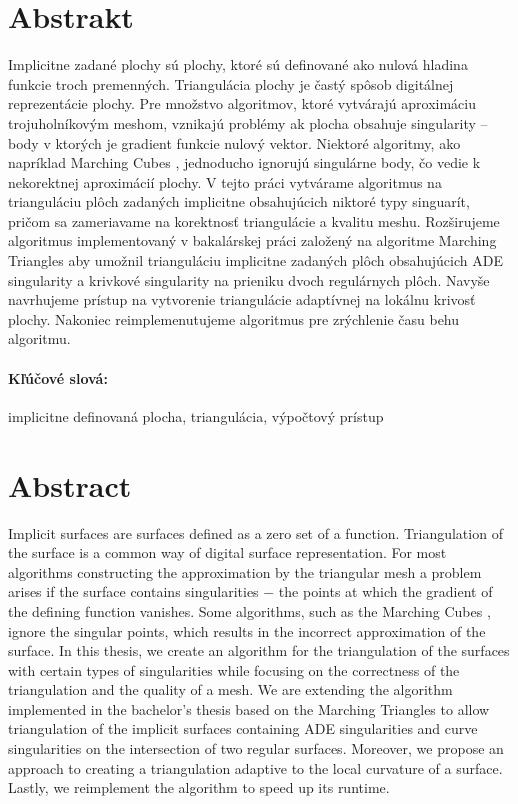 \documentclass[12pt, twoside]{book}
\begin{document}

\newpage 
\section*{Abstrakt}

Implicitne zadané plochy sú plochy, ktoré sú definované ako nulová hladina
funkcie troch premenných. Triangulácia plochy je častý spôsob digitálnej reprezentácie
plochy.
Pre množstvo algoritmov, ktoré vytvárajú aproximáciu trojuholníkovým meshom,
vznikajú problémy ak plocha obsahuje singularity -- body v ktorých je gradient funkcie
nulový vektor.
Niektoré algoritmy, ako napríklad Marching Cubes \cite{lorensen1987marching},
jednoducho ignorujú singulárne body, čo vedie k nekorektnej aproximácií plochy.
V tejto práci vytvárame algoritmus na trianguláciu plôch zadaných implicitne
obsahujúcich niktoré typy singuarít, pričom sa zameriavame na korektnosť
triangulácie a kvalitu meshu.
Rozširujeme algoritmus implementovaný v bakalárskej práci \cite{korecova2021triangulation}
založený na algoritme Marching Triangles \cite{hilton1996marching}
aby umožnil trianguláciu implicitne zadaných plôch obsahujúcich 
ADE singularity a krivkové singularity na prieniku dvoch regulárnych plôch.
Navyše navrhujeme prístup na vytvorenie triangulácie adaptívnej na 
lokálnu krivosť plochy. Nakoniec reimplemenutujeme algoritmus 
\cite{korecova2021triangulation} pre zrýchlenie času behu algoritmu.
\paragraph*{Kľúčové slová:} implicitne definovaná plocha, triangulácia, výpočtový prístup



\newpage 
\section*{Abstract}Implicit surfaces are surfaces defined as a zero set of a function.
Triangulation of the surface is a common way of digital surface
representation.
For most algorithms constructing the approximation by the triangular mesh
a problem arises if the surface contains singularities $-$ the points at which 
the gradient of the defining function vanishes.
Some algorithms, such as the Marching Cubes \cite{lorensen1987marching},
ignore the singular points, which results in the incorrect approximation
of the surface.
In this thesis, we create an algorithm for the triangulation of 
the surfaces with certain types of singularities while focusing on the
correctness of the triangulation and the quality of a mesh.
We are extending the algorithm implemented in the bachelor's thesis 
\cite{korecova2021triangulation}
based on the Marching Triangles \cite{hilton1996marching} to allow 
triangulation of the implicit surfaces containing ADE singularities
and curve singularities on the intersection of two regular surfaces.
Moreover, we propose an approach to creating a triangulation adaptive 
to the local curvature of a surface. Lastly, we reimplement the 
algorithm \cite{korecova2021triangulation} to speed up its runtime.
\end{document}

